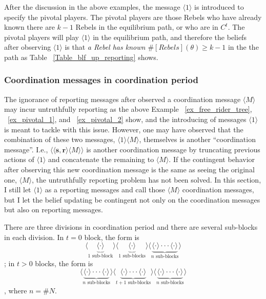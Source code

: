 \documentclass[12pt,letter]{article}
\theoremstyle{definition}
\theoremstyle{remark}
\theoremstyle{claim}
\begin{document}
After the discussion in the above examples, the message $\langle 1 \rangle$ is introduced to specify the pivotal players. The pivotal players are those Rebels who have already known there are $k-1$ Rebels in the equilibrium path, or who are in $C^t$. The pivotal players will play $\langle 1 \rangle$ in the equilibrium path, and therefore the beliefs after observing $\langle 1 \rangle$ is that \textit{a Rebel has known $\#[Rebels](\theta)\geq k-1$} in the the path as Table ~\ref{Table_blf_up_reporting} shows.




\subsubsection*{Coordination messages in coordination period}

The ignorance of reporting messages after observed a coordination message $\langle M \rangle$ may incur untruthfully reporting as the above Example ~\ref{ex_free_rider_tree}, ~\ref{ex_pivotal_1}, and ~\ref{ex_pivotal_2} show, and the introducing of messages $\langle 1 \rangle$ is meant to tackle with this issue. However, one may have observed that the combination of these two messages, $\langle 1 \rangle\langle M \rangle$, themselves is another ``coordination message''. I.e., $\langle\langle \textbf{s}, \textbf{r} \rangle\langle M \rangle\rangle$ is another coordination message by truncating previous actions of $\langle 1 \rangle$ and concatenate the remaining to $\langle M \rangle$. If the contingent behavior after observing this new coordination message is the same as seeing the original one, $\langle M \rangle$, the untruthfully reporting problem has not been solved. In this section, I still let $\langle 1 \rangle$ as a reporting messages and call those $\langle M \rangle$ coordination messages, but I let the belief updating be contingent not only on the coordination messages but also on reporting messages.


There are three divisions in coordination period and there are several sub-blocks in each division. In $t=0$ block, the form is
\[\langle\underbrace{\langle \cdot \rangle }_{\text{$1$ sub-block}}\rangle \langle\underbrace{\langle \cdot \rangle }_{\text{$1$ sub-blocks}} \rangle \langle\underbrace{\langle \cdot \rangle \cdot \cdot \cdot \langle \cdot \rangle}_{\text{$n$ sub-blocks}}\rangle\] 
; in $t>0$ blocks, the form is
\[\langle\underbrace{\langle \cdot \rangle \cdot \cdot \cdot \langle \cdot \rangle}_{\text{$n$ sub-blocks}}\rangle \langle\underbrace{\langle \cdot \rangle \cdot \cdot \cdot \langle \cdot \rangle}_{\text{$t+1$ sub-blocks}} \rangle \langle\underbrace{\langle \cdot \rangle \cdot \cdot \cdot \langle \cdot \rangle}_{\text{$n$ sub-blocks}}\rangle\] 
, where $n=\# N$. 
\end{document}

